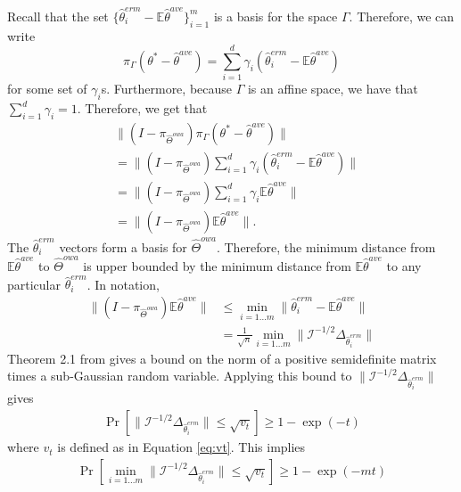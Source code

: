 \documentclass[twoside]{article}
\newcommand{\W}{{\hat \Theta^{\textit{owa}}}}
\newcommand{\Wowa}{{\hat \Theta^{\textit{owa}}}}
\newcommand{\E}{\mathbb{E}}
\newcommand{\w}{\theta}
\newcommand{\wave}{\hat\w^{ave}}
\newcommand{\wmle}{\hat\w^{erm}}
\newcommand{\wstar}{{\w^{*}}}
\newcommand{\I}{\mathcal I}
\newcommand{\ltwo}[1]{{\lVert {#1} \rVert}}
\newcommand{\proj}[1]{\pi_{{#1}}}
\newcommand{\prob}[1]{\Pr\left[{#1}\right]}
\begin{document}
Recall that the set $\{\wmle_i-\E\wave\}_{i=1}^m$ is a basis for the space $\Gamma$.
Therefore, we can write
\begin{equation}
\proj\Gamma(\wstar-\wave) = \sum_{i=1}^d \gamma_i(\wmle_i - \E\wave)
\end{equation}
for some set of $\gamma_i$s.
Furthermore, because $\Gamma$ is an affine space,
we have that $\sum_{i=1}^d\gamma_i=1$.
Therefore, we get that
\begin{align}
&\!\!\!\!\!\!\!\!\!\!\!\!\!\!\!\!\!\!\!\!\!
\ltwo{(I-\proj\Wowa)\proj\Gamma(\wstar-\wave)}
\\
&= \ltwo{(I-\proj\Wowa)\sum_{i=1}^d \gamma_i(\wmle_i - \E\wave)}
\\
&= \ltwo{(I-\proj\Wowa)\sum_{i=1}^d \gamma_i\E\wave}
\\
&= \ltwo{(I-\proj\Wowa)\E\wave}
.
\end{align}
The $\wmle_i$ vectors form a basis for $\Wowa$.
Therefore, the minimum distance from $\E\wave$ to $\Wowa$ is upper bounded by the minimum distance from $\E\wave$ to any particular $\wmle_i$.
In notation,
\begin{align}
\ltwo{(I-\proj\Wowa)\E\wave}
&\le \min_{i=1...m} \ltwo{\wmle_i - \E\wave}
\\
&=   \frac{1}{\sqrt n} \min_{i=1...m} \ltwo{\I^{-1/2}\Delta_{\wmle_i}}
\end{align}
Theorem 2.1 from \citet{hsu2012tail} gives a bound on the norm of a positive semidefinite matrix times a sub-Gaussian random variable.
Applying this bound to $\ltwo{\I^{-1/2}\Delta_{\wmle_i}}$ gives
\begin{align}
\prob{\ltwo{\I^{-1/2}\Delta_{\wmle_i}} \le \sqrt{v_t}} \ge 1 - \exp(-t)
\end{align}
where $v_t$ is defined as in Equation \ref{eq:vt}.
This implies
\begin{align}
\prob{\min_{i=1...m} \ltwo{\I^{-1/2}\Delta_{\wmle_i}} \le \sqrt{v_t}} \ge 1 - \exp(-mt)
\end{align}


\end{document}
